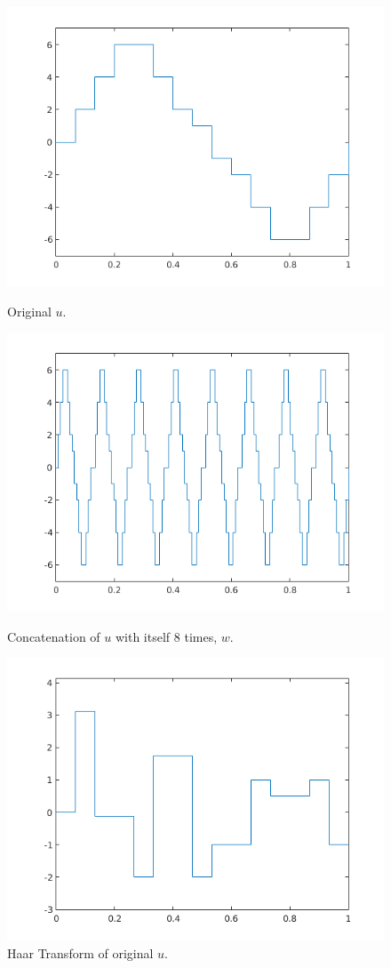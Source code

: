 \documentclass[paper=a4, fontsize=11pt]{scrartcl} %
\begin{document}
\begin{figure}[ht] 
      \label{ fig7} 
      \begin{minipage}[b]{0.5\linewidth}
          \centering
          \includegraphics[width=.5\linewidth]{orig.png} 
          \caption{Original $u$.} 
          \vspace{4ex}
      \end{minipage}%
      \begin{minipage}[b]{0.5\linewidth}
          \centering
          \includegraphics[width=.5\linewidth]{orig_cat.png} 
          \caption{Concatenation of $u$ with itself 8 times, $w$.} 
          \vspace{4ex}
      \end{minipage} 
      \begin{minipage}[b]{0.5\linewidth}
          \centering
          \includegraphics[width=.5\linewidth]{haar_orig.png} 
          \caption{Haar Transform of original $u$.} 
          \vspace{4ex}
      \end{minipage}%

\end{figure}
\end{document}
